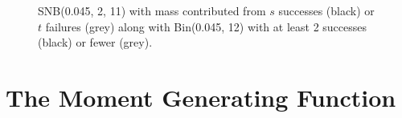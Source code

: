 \documentclass[review]{elsarticle}
\begin{document}
\begin{figure}[t!]
\centering
{}
\hfill
{}
\caption{
SNB(0.045, 2, 11) with mass contributed from 
$s$ successes (black) or $t$ failures (grey) along with Bin(0.045, 12) with
at least 2 successes (black) or fewer (grey).
}
\label{fig:snb_bin_compare}
\end{figure}

\section{The Moment Generating Function}
\end{document}
